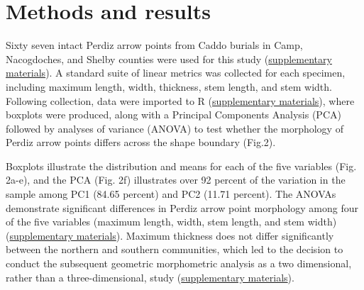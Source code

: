 \documentclass[smallextended]{svjour3}       %
\begin{document}
\hypertarget{methods-and-results}{%
\section{Methods and results}\label{methods-and-results}}

Sixty seven intact Perdiz arrow points from Caddo burials in Camp,
Nacogdoches, and Shelby counties were used for this study
(\href{https://seldenlab.github.io/perdiz3/}{supplementary materials}).
A standard suite of linear metrics was collected for each specimen,
including maximum length, width, thickness, stem length, and stem width.
Following collection, data were imported to R
(\href{https://seldenlab.github.io/perdiz3/}{supplementary materials}),
where boxplots were produced, along with a Principal Components Analysis
(PCA) followed by analyses of variance (ANOVA) to test whether the
morphology of Perdiz arrow points differs across the shape boundary
(Fig.2).

Boxplots illustrate the distribution and means for each of the five
variables (Fig. 2a-e), and the PCA (Fig. 2f) illustrates over 92 percent
of the variation in the sample among PC1 (84.65 percent) and PC2 (11.71
percent). The ANOVAs demonstrate significant differences in Perdiz arrow
point morphology among four of the five variables (maximum length,
width, stem length, and stem width)
(\href{https://seldenlab.github.io/perdiz3/}{supplementary materials}).
Maximum thickness does not differ significantly between the northern and
southern communities, which led to the decision to conduct the
subsequent geometric morphometric analysis as a two dimensional, rather
than a three-dimensional, study
(\href{https://seldenlab.github.io/perdiz3/}{supplementary materials}).
\end{document}
